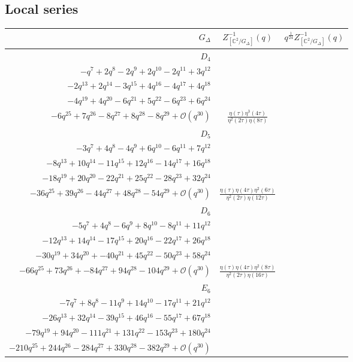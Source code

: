 \documentclass[11pt,a4paper]{amsart}
\theoremstyle{definition}
\newcommand{\SC}{\mathbb{C}}                    %
\begin{document}
\subsection{Local series}
\begin{center}
\begin{tabular}{|r| c| c|}
	\hline
	$G_{\Delta}$  & $Z^{-1}_{[\SC^2 / G_{\Delta}]}(q)$ & $q^{\frac{1}{24}}Z^{-1}_{[\SC^2 / G_{\Delta}]}(q)$ \\
	\hline
\hline
	$D_4$ & \makecell*{$1 - q + q^2 -2 q^3 - q^5 + 2q^6 $ \\ $ -q^7 + 2q^8  -2q^9 + 2q^{10}-2q^{11} + 3q^{12} $ \\ $ -2q^{13} + 2q^{14} -3q^{15} + 4q^{16} -4q^{17} + 4q^{18} $ \\ $ -4q^{19} + 4q^{20} -6q^{21} + 5q^{22}
	-6q^{23} + 6q^{24} $ \\ $ -6q^{25} + 7q^{26} -8q^{27} + 8q^{28} -8q^{29} + \mathcal{O}(q^{30})$ } & $\displaystyle \frac{\eta(\tau)\eta^3(4\tau)}{\eta^2(2\tau)\eta(8\tau)}$ \\
\hline
	$D_5$ & \makecell*{$1 -q + q^2 -2q^3 + 2q^4 -3q^5 + 2q^6 $ \\ $ -3q^7 +
	4q^8 -4q^9 + 6q^{10} -6q^{11} + 7q^{12} $ \\ $ -8q^{13} + 10q^{14}
	-11q^{15} + 12q^{16} -14q^{17} + 16q^{18} $ \\ $ -18q^{19} + 20q^{20}
	-22q^{21} + 25q^{22} -28q^{23} + 32q^{24} $ \\ $ -36q^{25} + 39q^{26}
	-44q^{27} + 48q^{28} -54q^{29}+ \mathcal{O}(q^{30})$} & $\displaystyle \frac{\eta(\tau)\eta(4\tau)\eta^2(6\tau)}{\eta^2(2\tau)\eta(12\tau)}$ \\
\hline
	$D_6$ & 
	\makecell*{$1 -q + q^2 -2q^3 + 2q^4 -3q^5 + 4q^6  $ \\ $ -5q^7 +
		4q^8 -6q^9 + 8q^{10} -8q^{11} + 11q^{12}  $ \\ $ -12q^{13} + 14q^{14} 
		-17q^{15} + 20q^{16} -22q^{17} + 26q^{18}  $ \\ $ -30q^{19} + 34q^{20} +
		-40q^{21} + 45q^{22} -50q^{23} + 58q^{24}  $ \\ $ -66q^{25} + 73q^{26} +
		-84q^{27} + 94q^{28} -104q^{29} + \mathcal{O}(q^{30})$}
	
	& $\displaystyle \frac{\eta(\tau)\eta(4\tau)\eta^2(8\tau)}{\eta^2(2\tau)\eta(16\tau)}$ \\
	\hline
	$E_6$ & 
	\makecell*{$1 -q + q^2 -2q^3 + 3q^4 -4q^5 + 5q^6 $ \\ $ -7q^7 +
	8q^8 -11q^9 + 14q^{10} -17q^{11} + 21q^{12} $ \\ $ -26q^{13} +
	32q^{14} -39q^{15} + 46q^{16} -55q^{17} + 67q^{18} $ \\ $ -79q^{19} +
	94q^{20} -111q^{21} + 131q^{22} -153q^{23} + 180q^{24} $ \\ $ -210q^{25}
	+ 244q^{26} -284q^{27} + 330q^{28} -382q^{29}  + \mathcal{O}(q^{30})$}
	

\end{tabular}
\end{center}
\end{document}
